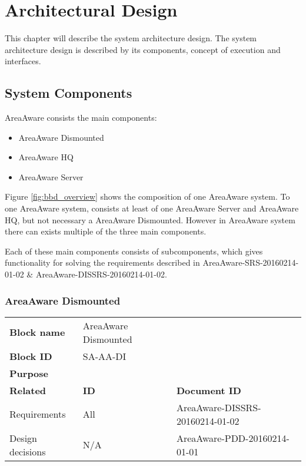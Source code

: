
\thispagestyle{fancy}
\chapter{Architectural Design}
\label{chp:architectural}

This chapter will describe the system architecture design.
The system architecture design is described by its components, concept of execution and interfaces.


\section{System Components}
AreaAware consists the main components:
\begin{itemize}
\item AreaAware Dismounted
\item AreaAware HQ
\item AreaAware Server
\end{itemize}
Figure \ref{fig:bbd_overview} shows the composition of one AreaAware system.
To one AreaAware system, consists at least of one AreaAware Server and AreaAware HQ, but not necessary a AreaAware Dismounted.
However in AreaAware system there can exists multiple of the three main components.


\noindent Each of these main components consists of subcomponents, which gives functionality for solving the requirements described in  AreaAware-SRS-20160214-01-02 \&  AreaAware-DISSRS-20160214-01-02.


\subsection{AreaAware Dismounted}

\begin{tabular}{l|*{2}{l}}
    \textbf{Block name}     & AreaAware Dismounted \\
    \textbf{Block ID}       & SA-AA-DI \\
    \textbf{Purpose}        &  \\
    \hline
    \textbf{Related}    & \textbf{ID} & \textbf{Document ID} \\
    Requirements & All & AreaAware-DISSRS-20160214-01-02 \\
    Design decisions & N/A & AreaAware-PDD-20160214-01-01 \\
\end{tabular}\\\\

